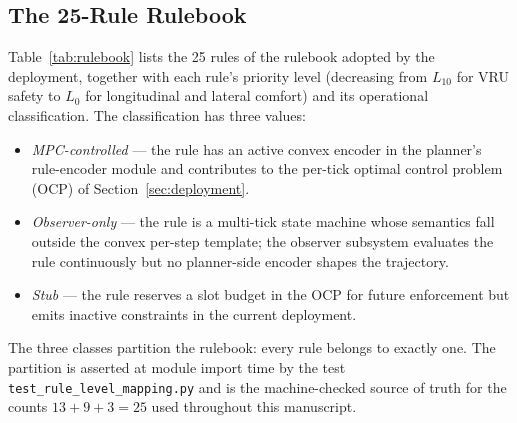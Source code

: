 
\subsection{The 25-Rule Rulebook}
\label{sec:rulebook:roster}

Table~\ref{tab:rulebook} lists the 25 rules of the rulebook adopted by the deployment, together with each rule's priority level (decreasing from $L_{10}$ for VRU safety to $L_0$ for longitudinal and lateral comfort) and its operational classification. The classification has three values:
\begin{itemize}[leftmargin=*,noitemsep]
    \item \emph{MPC-controlled} --- the rule has an active convex encoder in the planner's rule-encoder module and contributes to the per-tick optimal control problem (OCP) of Section~\ref{sec:deployment}.
    \item \emph{Observer-only} --- the rule is a multi-tick state machine whose semantics fall outside the convex per-step template; the observer subsystem evaluates the rule continuously but no planner-side encoder shapes the trajectory.
    \item \emph{Stub} --- the rule reserves a slot budget in the OCP for future enforcement but emits inactive constraints in the current deployment.
\end{itemize}
The three classes partition the rulebook: every rule belongs to exactly one. The partition is asserted at module import time by the test \texttt{test\_rule\_level\_mapping.py} and is the machine-checked source of truth for the counts $13 + 9 + 3 = 25$ used throughout this manuscript.


